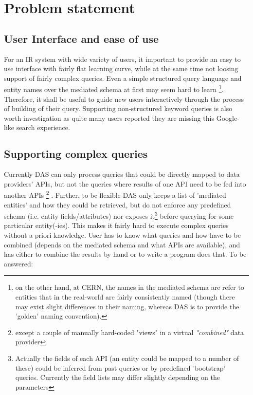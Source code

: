 
\section{Problem statement}
\subsection{User Interface and ease of use}

For an IR system with wide variety of users, it important to provide an easy to use interface with fairly flat learning curve, while at the same time not loosing support of fairly complex queries.
%
	Even a simple structured query language and entity names over the mediated schema  at first may seem hard to learn%
	\footnote{on the other hand, at CERN, the names in the mediated schema are refer to entities that in the real-world are fairly consistently named (though there may exist slight differences in their naming, whereas DAS is to provide the 'golden' naming convention).}. Therefore, it shall be useful to guide new users interactively through the process of building of their query.
%   
   Supporting non-structured keyword queries is also worth investigation as quite many users reported they are missing this Google-like search experience.
        
        
\subsection{Supporting complex queries}
Currently DAS can only process queries that could be directly mapped to data providers' APIs, but not the queries where results of one API need to be fed into another APIs 
	\footnote{except a couple of manually hard-coded "views" in a virtual \textit{"combined"} data provider}%
. %
Further, to be flexible DAS only keeps a list of 'mediated entities' and how they could be retrieved, but do not enforce any predefined schema (i.e. entity fields/attributes) nor exposes it\footnote{%
	Actually the fields of each API  (an entity could be mapped to a number of these) could be inferred 
	from past queries or by predefined 'bootstrap' queries. Currently the field lists may differ slightly depending on the parameters}
before querying for some particular entity(-ies). 
%
This makes it fairly hard to execute complex queries  without a priori knowledge.
User has to know what queries and how have to be combined (depends on the mediated schema and what APIs are available), and has either to combine the results by hand or to write a program does that.
%
To be answered:

